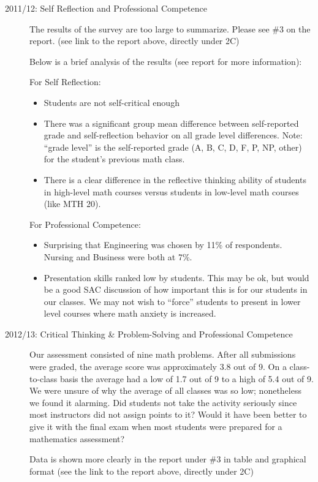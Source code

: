 \begin{description}

\item[2011/12: Self Reflection and Professional Competence]
The results of the survey are too large to summarize.  Please see \#3 on the report.  (see link to the report above, directly under 2C) 

Below is a brief analysis of the results (see report for more information):

For Self Reflection: 
\begin{itemize}
\item Students are not self-critical enough
\item There was a significant group mean difference between self-reported grade and self-reflection behavior on all grade level differences.  Note: ``grade level'' is the self-reported grade (A, B, C, D, F, P, NP, other) for the student's previous math class.
\item There is a clear difference in the reflective thinking ability of students in high-level math courses versus students in low-level math courses (like MTH 20).
\end{itemize}
For Professional Competence:
\begin{itemize}
\item Surprising that Engineering was chosen by 11\% of respondents. Nursing and Business were both at 7\%.\
\item Presentation skills ranked low by students. This may be ok, but would be a good SAC discussion of how important this is for our students in our classes. We may not wish to ``force'' students to present in lower level courses where math anxiety is increased.
\end{itemize}

\item[2012/13:  Critical Thinking \& Problem-Solving and Professional Competence]

Our assessment consisted of nine math problems.  After all submissions were graded, the average score was approximately 3.8 out of 9.  On a class-to-class basis the average had a low of 1.7 out of 9 to a high of 5.4 out of 9.  We were unsure of why the average of all classes was so low; nonetheless we found it alarming.  Did students not take the activity seriously since most instructors did not assign points to it?  Would it have been better to give it with the final exam when most students were prepared for a mathematics assessment? 

Data is shown more clearly in the report under \#3 in table and graphical format (see the link to the report above, directly under 2C)


\end{description}
